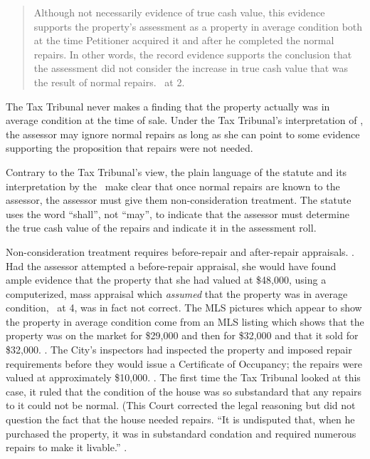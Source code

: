 \documentclass[12pt,\documentclassflag]{michiganCourtOfAppealsBrief}
\def\mathieuGast{\pincite[l]{MCL}{211.27(2)}}
\begin{document}
\begin{quote}
	Although not necessarily evidence of true cash value, this evidence supports the property's assessment as a property in average condition both at the time Petitioner acquired it and after he completed the normal repairs. In other words, the record evidence supports the conclusion that the assessment did not consider the increase in true cash value that was the result of normal repairs. \orderDenying\ at 2. 
\end{quote}

The Tax Tribunal never makes a finding that the property actually was in average condition at the time of sale. Under the Tax Tribunal's interpretation of \mathieuGast, the assessor may ignore normal repairs as long as she can point to some evidence supporting the proposition that repairs were not needed.

Contrary to the Tax Tribunal's view, the plain language of the statute and its interpretation by the \STC\ make clear that once normal repairs are known to the assessor, the assessor must give them non-consideration treatment. The statute uses the word ``shall'', not ``may'', to indicate that the assessor must determine the true cash value of the repairs and indicate it in the assessment roll.

Non-consideration treatment requires before-repair and after-repair appraisals. . Had the assessor attempted a before-repair appraisal, she would have found ample evidence that the property that she had valued at \$48,000, using a computerized, mass appraisal which \textit{assumed} that the property was in average condition, \FOJ\ at 4, was in fact not correct. The MLS pictures which appear to show the property in average condition come from an MLS listing which shows that the property was on the market for \$29,000 and then for \$32,000 and that it sold for \$32,000. \mlsprintout. The City's inspectors had inspected the property and imposed repair requirements before they would issue a Certificate of Occupancy; the repairs were valued at approximately \$10,000. \repairs. The first time the Tax Tribunal looked at this case, it ruled that the condition of the house was so substandard that any repairs to it could not be normal. (This Court corrected the legal reasoning but did not question the fact that the house needed repairs. ``It is undisputed that, when he purchased the property, it was in substandard condation and required numerous repairs to make it livable.'' . 
\end{document}
